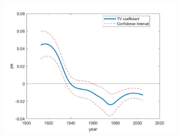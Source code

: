 \documentclass[12pt,a4paper]{article}
\begin{document}
\begin{figure}[!htp]
	\caption{Time-varying Coefficient of Subsidy}
	\centering
	\begin{subfigure}[b]{0.7\linewidth}
		\includegraphics[width=\linewidth]{CI_n101.jpg}
	\end{subfigure}
\end{figure}


\end{document}
